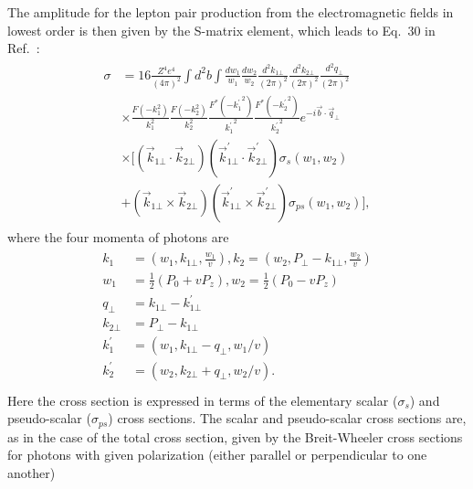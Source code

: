 \documentclass[twocolumn,epjc3]{svjour3}\sloppy
\begin{document}
The amplitude for the lepton pair production from the electromagnetic fields in lowest order is then given by the S-matrix element, which leads to Eq.~30 in Ref.~\cite{PhysRevC.47.2308}:
\begin{align}
    \label{eq:gEPA}
    \begin{split}
    \sigma & = 16\frac{Z^{4}e^{4}}{(4\pi)^{2}}\int d^{2}b \int \frac{dw_{1}}{w_{1}} \frac{dw_{2}}{w_{2}} \frac{d^{2}k_{1\bot}}{(2\pi)^{2}} \frac{d^{2}k_{2\bot}}{(2\pi)^{2}} \frac{d^{2}q_{\bot}}{(2\pi)^{2}}\\
     &\times \frac{F(-k_{1}^{2})}{k_{1}^{2}} \frac{F(-k_{2}^{2})}{k_{2}^{2}} \frac{F^{*}(-{k_{1}^{\prime}}^{2})}{{k_{1}^{\prime}}^{2}} \frac{F^{*}(-{k_{2}^{\prime}}^{2})}{{k_{2}^{\prime}}^{2}} e^{-i\vec{b} \cdot \vec{q}_{\bot}} \\
     & \times \big[(\vec{k}_{1\bot} \cdot \vec{k}_{2\bot})(\vec{k}^{\prime}_{1\bot} \cdot \vec{k}^{\prime}_{2\bot}) \sigma_{s}(w_{1},w_{2})\\
     & +(\vec{k}_{1\bot} \times \vec{k}_{2\bot})(\vec{k}^{\prime}_{1\bot} \times \vec{k}^{\prime}_{2\bot})\sigma_{ps}(w_{1},w_{2})\big], 
    \end{split}
\end{align}
where the four momenta of photons are
\begin{align}
    \label{equation4}
    \begin{split}
    k_{1} & = (w_{1}, k_{1\bot},\frac{w_{1}}{v}), k_{2} = (w_{2}, P_{\bot} - k_{1\bot},\frac{w_{2}}{v})\\
    w_{1} & =\frac{1}{2}(P_{0}+vP_{z}), w_{2} = \frac{1}{2}(P_{0}-vP_{z}) \\
    q_{\bot} & = k_{1\bot} -k_{1\bot}^{\prime} \\
    k_{2\bot} & = P_{\bot} - k_{1\bot} \\
    k_{1}^{\prime} & =(w_{1}, k_{1\bot} - q_{\bot},w_{1}/v)\\
    k_{2}^{\prime} & =(w_{2}, k_{2\bot} + q_{\bot},w_{2}/v).\\
    \end{split}
\end{align}
Here the cross section is expressed in terms of the elementary scalar ($\sigma_s$) and pseudo-scalar ($\sigma_{ps}$) cross sections. The scalar and pseudo-scalar cross sections are, as in the case of the total cross section, given by the Breit-Wheeler cross sections for photons with given polarization (either parallel or perpendicular to one another)
\end{document}
